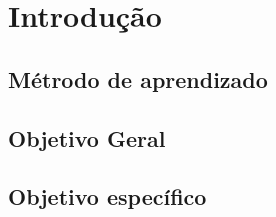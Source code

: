 \chapter[Introdução]{Introdução}


\section{Métrodo de aprendizado}
\section{Objetivo Geral}
\section{Objetivo específico}
